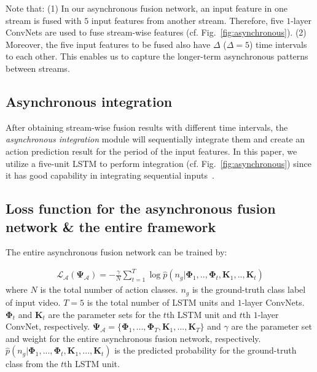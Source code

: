 \documentclass[letterpaper]{article}
\begin{document}
Note that: (1) In our asynchronous fusion network, an input feature in one stream is fused with $5$ input features from another stream. Therefore, five $1$-layer ConvNets are used to fuse stream-wise features (cf. Fig.~\ref{fig:asynchronous}). (2) Moreover, the five input features to be fused also have $\Delta$ ($\Delta=5$) time intervals to each other. This enables us to capture the longer-term asynchronous patterns between streams.





\subsection{Asynchronous integration}

After obtaining stream-wise fusion results with different time intervals, the \emph{asynchronous integration} module will sequentially integrate them and create an action prediction result for the period of the input features. In this paper, we utilize a five-unit LSTM to perform integration (cf. Fig.~\ref{fig:asynchronous}) since it has good capability in integrating sequential inputs~\cite{LSTM}. %


\subsection{Loss function for the asynchronous fusion network \& the entire framework}

The entire asynchronous fusion network can be trained by:

\begin{equation}
\begin{aligned}
\mathcal{L}_{\mathcal{A}}(\mathbf{\Psi}_\mathcal{A})=-\frac{\gamma}{N} \sum_{t=1}^{T}\log{\hat{p}(n_g|\mathbf{\Phi}_1,..,\mathbf{\Phi}_t,\mathbf{K}_1,..,\mathbf{K}_t)}
\end{aligned}
\label{equation:equ5}
\end{equation}
where $N$ is the total number of action classes. $n_g$ is the ground-truth class label of input video. $T=5$ is the total number of LSTM units and $1$-layer ConvNets. $\mathbf{\Phi}_t$ and $\mathbf{K}_t$ are the parameter sets for the $t$th LSTM unit and $t$th $1$-layer ConvNet, respectively. $\mathbf{\Psi_{\mathcal{A}}}=\{\mathbf{\Phi}_1,...,\mathbf{\Phi}_T,\mathbf{K}_1,...,\mathbf{K}_T\}$ and $\gamma$ are the parameter set and weight for the entire asynchronous fusion network, respectively. $\hat{p}(n_g|\mathbf{\Phi}_1,...,\mathbf{\Phi}_t,\mathbf{K}_1,...,\mathbf{K}_t)$ is the predicted probability for the ground-truth class from the $t$th LSTM unit.
\end{document}
